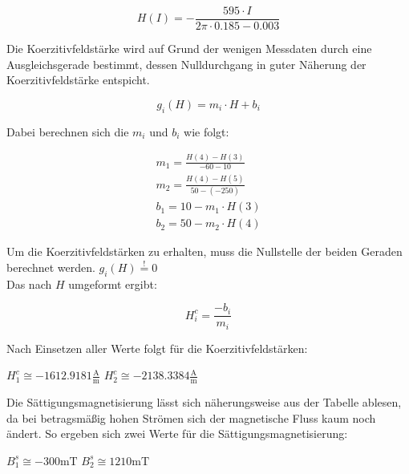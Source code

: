 \begin{equation}
H(I)=-\frac{595\cdot I}{2\pi \cdot 0.185-0.003}
\end{equation}

Die Koerzitivfeldstärke wird auf Grund der wenigen Messdaten durch eine Ausgleichsgerade bestimmt, dessen
Nulldurchgang in guter Näherung der Koerzitivfeldstärke entspicht.

\begin{equation}
g_i(H)=m_i\cdot H+b_i
\end{equation}
  
Dabei berechnen sich die $m_i$ und $b_i$ wie folgt:

\begin{gather}
m_1=\frac{H(4)-H(3)}{-60-10} \\
m_2=\frac{H(4)-H(5)}{50-(-250)}\\
b_1=10-m_1\cdot H(3)\\
b_2=50-m_2\cdot H(4)
\end{gather}

Um die Koerzitivfeldstärken zu erhalten, muss die Nullstelle der beiden Geraden berechnet werden. \quad $g_i(H) \stackrel{!}{=}0$\\
Das nach $H$ umgeformt ergibt:

\begin{equation}
H_{i}^{c}=\frac{-b_i}{m_i}
\end{equation}

Nach Einsetzen aller Werte folgt für die Koerzitivfeldstärken:

\quad $H_{1}^{c}\cong -1612.9181 \frac{\si{\ampere}}{\si{\m}}$
\quad $H_{2}^{c}\cong -2138.3384 \frac{\si{\ampere}}{\si{\m}}$

Die Sättigungsmagnetisierung lässt sich näherungsweise aus der Tabelle ablesen, da bei betragsmäßig hohen
Strömen sich der magnetische Fluss kaum noch ändert. So ergeben sich zwei Werte für die Sättigungsmagnetisierung:

\quad $B_{1}^{s}\cong -300 \si{\milli\tesla}$
\quad $B_{2}^{s}\cong 1210 \si{\milli\tesla}$























